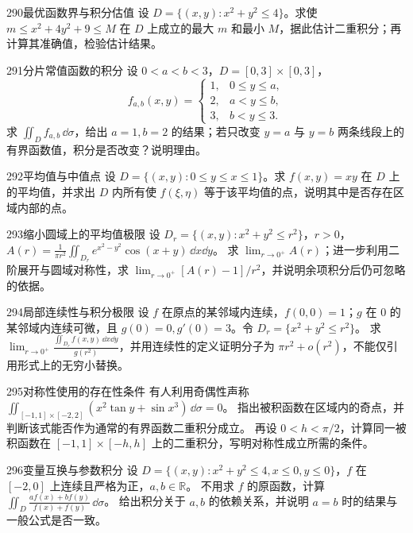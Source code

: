 \begin{exercise}{290}{最优函数界与积分估值}
设 $D=\{(x,y):x^2+y^2\leq4\}$。求使 $m\leq x^2+4y^2+9\leq M$ 在 $D$ 上成立的最大 $m$ 和最小 $M$，据此估计二重积分；再计算其准确值，检验估计结果。
\end{exercise}

\begin{exercise}{291}{分片常值函数的积分}
设 $0<a<b<3$，$D=[0,3]\times[0,3]$，
\[
 f_{a,b}(x,y)=\begin{cases}1,&0\leq y\leq a,\\2,&a<y\leq b,\\3,&b<y\leq3.\end{cases}
\]
求 $\iint_D f_{a,b}\,\dd\sigma$，给出 $a=1,b=2$ 的结果；若只改变 $y=a$ 与 $y=b$ 两条线段上的有界函数值，积分是否改变？说明理由。
\end{exercise}

\begin{exercise}{292}{平均值与中值点}
设 $D=\{(x,y):0\leq y\leq x\leq1\}$。求 $f(x,y)=xy$ 在 $D$ 上的平均值，并求出 $D$ 内所有使 $f(\xi,\eta)$ 等于该平均值的点，说明其中是否存在区域内部的点。
\end{exercise}

\begin{exercise}{293}{缩小圆域上的平均值极限}
设 $D_r=\{(x,y):x^2+y^2\leq r^2\}$，$r>0$，
$A(r)=\frac1{\pi r^2}\iint_{D_r}e^{x^2-y^2}\cos(x+y)\,\dd x\dd y$。
求 $\lim_{r\to0^+}A(r)$；进一步利用二阶展开与圆域对称性，求 $\lim_{r\to0^+}[A(r)-1]/r^2$，并说明余项积分后仍可忽略的依据。
\end{exercise}

\begin{exercise}{294}{局部连续性与积分极限}
设 $f$ 在原点的某邻域内连续，$f(0,0)=1$；$g$ 在 $0$ 的某邻域内连续可微，且 $g(0)=0,g'(0)=3$。令 $D_r=\{x^2+y^2\leq r^2\}$。
求 $\lim_{r\to0^+}\frac{\iint_{D_r}f(x,y)\,\dd x\dd y}{g(r^2)}$，并用连续性的定义证明分子为 $\pi r^2+o(r^2)$，不能仅引用形式上的无穷小替换。
\end{exercise}

\begin{exercise}{295}{对称性使用的存在性条件}
有人利用奇偶性声称
$\iint_{[-1,1]\times[-2,2]}(x^2\tan y+\sin x^3)\,\dd\sigma=0$。
指出被积函数在区域内的奇点，并判断该式能否作为通常的有界函数二重积分成立。
再设 $0<h<\pi/2$，计算同一被积函数在 $[-1,1]\times[-h,h]$ 上的二重积分，写明对称性成立所需的条件。
\end{exercise}

\begin{exercise}{296}{变量互换与参数积分}
设 $D=\{(x,y):x^2+y^2\leq4,x\leq0,y\leq0\}$，$f$ 在 $[-2,0]$ 上连续且严格为正，$a,b\in\mathbb R$。
不用求 $f$ 的原函数，计算
$\iint_D\frac{af(x)+bf(y)}{f(x)+f(y)}\,\dd\sigma$。
给出积分关于 $a,b$ 的依赖关系，并说明 $a=b$ 时的结果与一般公式是否一致。
\end{exercise}

